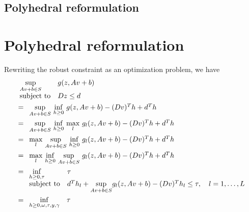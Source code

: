 \ifpreprint
\subsection{Polyhedral reformulation}
\else 
\section{Polyhedral reformulation}
\fi 
\label{apx:polyproof}
Rewriting the robust constraint as an optimization problem, we have
\begin{equation*}
	\begin{aligned}
& \begin{array}[t]{ll}
	\underset{Av+b\in S}{\sup} & g(z,Av+b) \\
	\mbox{subject to} & Dz \le d
\end{array}\\
&= \begin{array}[t]{ll}
	\underset{Av+b\in S}{\sup} ~\underset{h \geq 0}{\inf} ~g(z,Av+b)  - (Dv)^Th   + d^Th\\
	\end{array}\\
	&= \begin{array}[t]{ll}
		\underset{Av+b\in S}{\sup}~\underset{h \geq 0}{\inf}~\underset{l}{\max}~g_l(z,Av+b)  - (Dv)^Th   + d^Th\\
		\end{array}\\
		&= \begin{array}[t]{ll}
			\underset{l}{\max}~\underset{Av+b\in S}{\sup}~\underset{h \geq 0}{\inf}~g_l(z,Av+b)  - (Dv)^Th   + d^Th\\
			\end{array}\\
		&= \begin{array}[t]{ll}
				\underset{l}{\max}~\underset{h \geq 0}{\inf}~\underset{Av+b\in S}{\sup}~g_l(z,Av+b)  - (Dv)^Th   + d^Th\\
				\end{array}\\
&= \begin{array}[t]{ll}
	\underset{h\geq 0,\tau}{\inf} & \tau \\
	\mbox{subject to}& d^Th_l + \underset{Av+b\in S}{\sup } g_l(z,Av+b) - (Dv)^Th_l \leq \tau, \quad l = 1,\dots,L
\end{array}\\
&= \begin{array}[t]{ll}
	\underset{h \geq 0, \omega,\tau, y, \gamma}{\inf} &\tau\\

\end{array}
\end{aligned}
\end{equation*}
